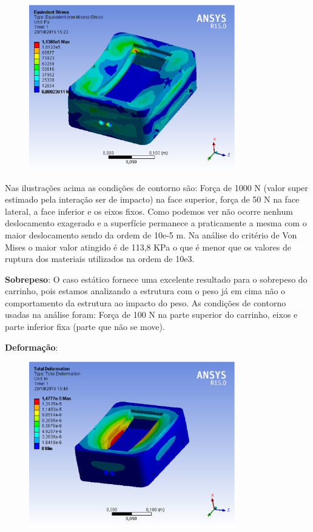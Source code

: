 \begin{figure}[H]
    \centering
    \includegraphics[width=0.8\textwidth]{figuras/vonmises_1000n.eps}
    \caption{}
    \label{fig:catia01}
\end{figure}

Nas ilustrações acima as condições de contorno são: Força de 1000 N (valor super estimado pela interação ser de impacto) na face superior, força de 50 N na face lateral, a face inferior e os eixos fixos. Como podemos ver não ocorre nenhum deslocamento exagerado e a superfície permanece a praticamente a mesma com o maior deslocamento sendo da ordem de 10e-5 m. Na análise do critério de Von Mises o maior valor atingido é de 113,8 KPa o que é menor que os valores de ruptura dos materiais utilizados  na ordem de 10e3.
 
\textbf{Sobrepeso}: O caso estático fornece uma excelente resultado para o sobrepeso do carrinho, pois estamos analizando a estrutura com o peso já em cima não o comportamento da estrutura ao impacto do peso. As condições de contorno usadas na análise foram: Força de 100 N na parte superior do carrinho, eixos e parte inferior fixa (parte que não se move).
 
\textbf{Deformação}:

\begin{figure}[H]
    \centering
    \includegraphics[width=0.8\textwidth]{figuras/deformacao_peso100n.eps}
    \caption{}
    \label{fig:catia01}
\end{figure}

